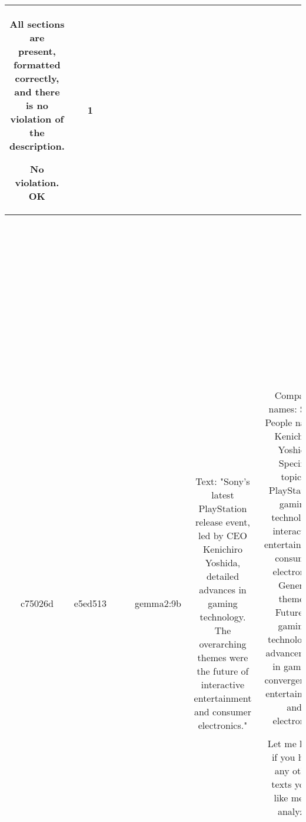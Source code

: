 \begin{table}[h!]
\begin{tabular}{|c|c|c|c|c|c|c|c|c|c|}
All sections are present, formatted correctly, and there is no violation of the description. 

No violation.
OK & 1\\
\hline
c75026d & e5ed513 &  &  & gemma2:9b & Text: "Sony's latest PlayStation release event, led by CEO Kenichiro Yoshida, detailed advances in gaming technology. The overarching themes were the future of interactive entertainment and consumer electronics." & Company names: Sony 
People names: Kenichiro Yoshida
Specific topics: PlayStation, gaming technology, interactive entertainment, consumer electronics
General themes:  Future of gaming, technological advancements in gaming, convergence of entertainment and electronics 


Let me know if you have any other texts you'd like me to analyze! 
 & ok & The output complies with the format specified in the description. It includes four categories: company names, people names, specific topics, and general themes. Each category is filled with a comma-separated list or a list in line with the format. Additionally, the message "Let me know if you have any other texts you'd like me to analyze!" does not impact the compliance with the described output format, so it can be ignored in terms of format evaluation. Therefore, there are no detected violations of the chatbot description regarding the required format.

No violation.
OK & 1\\
\hline
72f4ed4 & e5ed513 &  &  & gemma2:9b & Text: "Environmental activist Greta Thunberg addressed the United Nations on climate change, emphasizing the urgency of sustainable practices. Environmental policy and youth activism were central themes." & Company names: 
People names: Greta Thunberg
Specific topics:  environmental activism, climate change, sustainable practices, environmental policy, youth activism 
General themes: urgency of addressing environmental issues, the role of youth in activism  


Let me know if you'd like me to analyze any other texts! & err & The chatbot output follows the specified format with sections for "Company names," "People names," "Specific topics," and "General themes." However, there seems to be a missing component in the "Company names" field, which is left blank. This indicates a potential compliance issue, as there should be an indication of whether there are company names present or not (for instance, "None" if applicable). Without more information, I have to consider this non-compliance with the description, which requires all categories to be filled appropriately.


\end{tabular}
\end{table}
